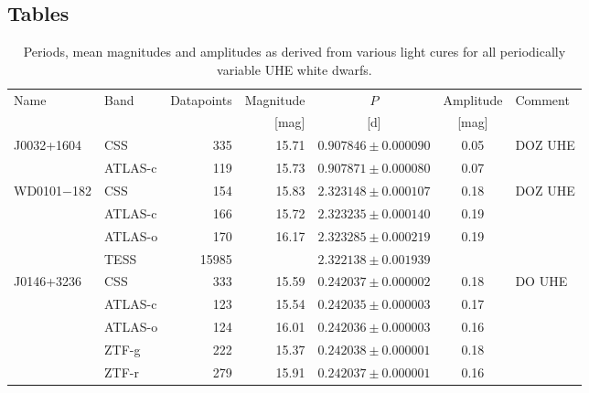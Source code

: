\documentclass{aa}
\begin{document}
\begin{appendix}
 
\section{Tables}
 
\begin{table}
\caption{Periods, mean magnitudes and amplitudes as derived from various light cures for
  all periodically variable UHE white dwarfs.}
\label{tab:periods}
\begin{tabular}{l l r r c c l}
\hline\hline
\noalign{\smallskip}
Name & Band & Datapoints & Magnitude & $P$ & Amplitude & Comment \\
     &      &            &  [mag]    & [d] & [mag]     &         \\  
\hline
\noalign{\smallskip}
J0032+1604&    CSS        &           335        &           15.71    &              $0.907846\pm0.000090$&        0.05 & DOZ UHE\\
              &           ATLAS-c              &           119        &           15.73    &              $0.907871\pm0.000080$&        0.07 & \\
\noalign{\smallskip}
WD0101$-$182&           CSS        &           154        &           15.83    &       $2.323148\pm0.000107$&        0.18 & DOZ UHE \\
        &   ATLAS-c              &           166        &           15.72    &              $2.323235\pm0.000140$&        0.19 & \\
              &           ATLAS-o             &           170        &           16.17    &              $2.323285\pm0.000219$&        0.19 & \\
        &   TESS      &           15985   &                         &              $2.322138\pm0.001939$&        &           \\
\noalign{\smallskip}
J0146+3236&    CSS        &           333        & 15.59 & $0.242037\pm0.000002$ & 0.18 &DO UHE \\
              &           ATLAS-c              &           123        & 15.54 & $0.242035\pm0.000003$ & 0.17 & \\
              &           ATLAS-o             &           124        & 16.01 & $0.242036\pm0.000003$ & 0.16 & \\
               & ZTF-g  &       222     & 15.37 & $0.242038\pm0.000001$ & 0.18 &  \\
               & ZTF-r  &       279     & 15.91 & $0.242037\pm0.000001$ & 0.16 &  \\

\end{tabular}
\end{table}
\end{appendix}
\end{document}
